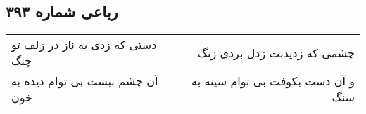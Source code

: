 \begin{center}
\section*{رباعی شماره ۳۹۳}
\label{sec:sh393}
\begin{longtable}{l p{0.5cm} r}
دستی که زدی به ناز در زلف تو چنگ
&&
چشمی که زدیدنت زدل بردی زنگ
\\
آن چشم ببست بی توام دیده به خون
&&
و آن دست بکوفت بی توام سینه به سنگ
\\
\end{longtable}
\end{center}

